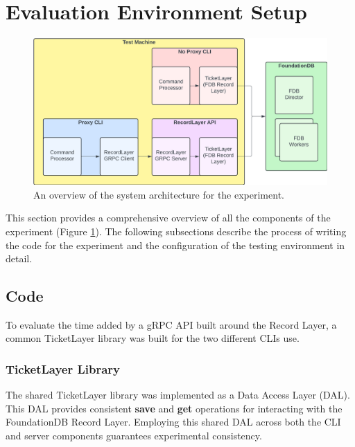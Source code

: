 \documentclass[sigconf]{acmart}
\begin{document}
\section{Evaluation Environment Setup}

\begin{figure}[t]
  \centering
  \includegraphics[width=\linewidth]{diag_system.png}
  \caption{An overview of the system architecture for the experiment.}
  \label{fig:diag_system}
\end{figure}

This section provides a comprehensive overview of all the components of the experiment (Figure \ref{fig:diag_system}). The following subsections describe the process of writing the code\cite{PaperGithub} for the experiment and the configuration of the testing environment in detail.

\subsection{Code}

To evaluate the time added by a gRPC API built around the Record Layer, a common TicketLayer library was built for the two different CLIs use.

\subsubsection{TicketLayer Library}

The shared TicketLayer library was implemented as a Data Access Layer (DAL). This DAL provides consistent \textbf{save} and \textbf{get} operations for interacting with the FoundationDB Record Layer. Employing this shared DAL across both the CLI and server components guarantees experimental consistency.
\end{document}

